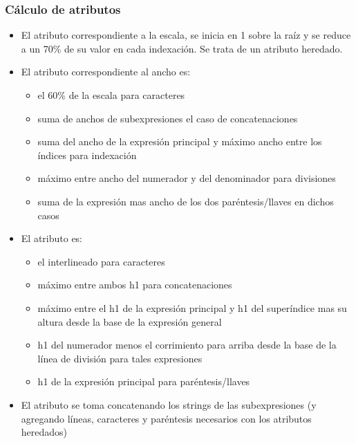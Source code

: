 \subsubsection{Cálculo de atributos}

\begin{itemize}
	\item El atributo \textbf{} correspondiente a la escala, se inicia en 1 sobre la raíz y se reduce a un 70\% de su valor en cada indexación. Se trata de un atributo heredado.

	\item El atributo \textbf{} correspondiente al ancho es:
	\begin{itemize}
		\item el 60\% de la escala para caracteres
		\item suma de anchos de subexpresiones el caso de concatenaciones
		\item suma del ancho de la expresión principal y máximo ancho entre los índices para indexación
		\item máximo entre ancho del numerador y del denominador para divisiones
		\item suma de la expresión mas ancho de los dos paréntesis/llaves en dichos casos
	\end{itemize}

	\item El atributo \textbf{} es:
	\begin{itemize}
		\item el interlineado para caracteres
		\item máximo entre ambos h1 para concatenaciones
		\item máximo entre el h1 de la expresión principal y h1 del superíndice mas su altura desde la base de la expresión general
		\item h1 del numerador menos el corrimiento para arriba desde la base de la línea de división para tales expresiones
		\item h1 de la expresión principal para paréntesis/llaves
	\end{itemize}

	\item El atributo \textbf{} se toma concatenando los strings de las subexpresiones (y agregando líneas, caracteres y paréntesis necesarios con los atributos heredados)

\end{itemize}
